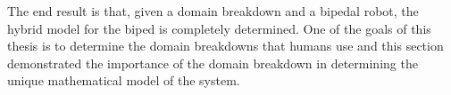 The end result is that, given a domain breakdown and a bipedal robot, the hybrid model for the biped is completely determined.
%
One of the goals of this thesis is to determine the domain breakdowns that humans use and this section demonstrated the importance of the domain breakdown in determining the unique mathematical model of the system.
